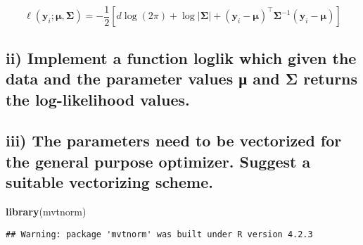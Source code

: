 \documentclass[
]{article}
\newenvironment{Shaded}{\begin{snugshade}}{\end{snugshade}}
\newcommand{\FunctionTok}[1]{\textcolor[rgb]{0.13,0.29,0.53}{\textbf{#1}}}
\newcommand{\NormalTok}[1]{#1}
\begin{document}
\[
\ell(\mathbf{y}_i; \boldsymbol{\mu}, \boldsymbol{\Sigma}) = 
-\frac{1}{2} \left[ d \log(2\pi) + \log|\boldsymbol{\Sigma}| + (\mathbf{y}_i - \boldsymbol{\mu})^\top \boldsymbol{\Sigma}^{-1} (\mathbf{y}_i - \boldsymbol{\mu}) \right]
\]

\subsection{ii) Implement a function loglik which given the data and the
parameter values μ and Σ returns the log-likelihood
values.}\label{ii-implement-a-function-loglik-which-given-the-data-and-the-parameter-values-ux3bc-and-ux3c3-returns-the-log-likelihood-values.}

\subsection{iii) The parameters need to be vectorized for the general
purpose optimizer. Suggest a suitable vectorizing
scheme.}\label{iii-the-parameters-need-to-be-vectorized-for-the-general-purpose-optimizer.-suggest-a-suitable-vectorizing-scheme.}

\begin{Shaded}
\begin{Highlighting}[]
\FunctionTok{library}\NormalTok{(mvtnorm)}
\end{Highlighting}
\end{Shaded}

\begin{verbatim}
## Warning: package 'mvtnorm' was built under R version 4.2.3
\end{verbatim}
\end{document}
